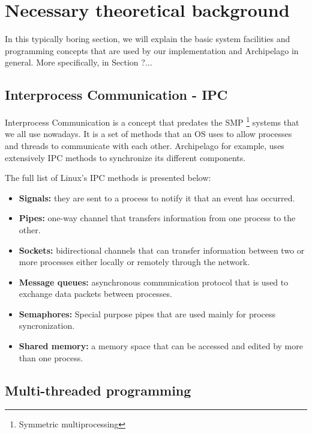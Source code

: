 \chapter{Necessary theoretical background}\label{ch:theory}

In this typically boring section, we will explain the basic system facilities 
and programming concepts that are used by our implementation and Archipelago in 
general. More specifically, in Section ?...

\section{Interprocess Communication - IPC}

Interprocess Communication is a concept that predates the SMP
\footnote{Symmetric multiprocessing}
systems that we all use nowadays. It is a set of methods that an OS uses to 
allow processes and threads to communicate with each other. Archipelago for 
example, uses extensively IPC methods to synchronize its different components.

The full list of Linux's IPC methods is presented below:

\begin{itemize}
	\item \textbf{Signals:} they are sent to a process to notify it that an 
		event has occurred.
	\item \textbf{Pipes:} one-way channel that transfers information from one 
		process to the other.
	\item \textbf{Sockets:} bidirectional channels that can transfer 
		information between two or more processes either locally or remotely 
		through the network.
	\item \textbf{Message queues:} asynchronous communication protocol that is 
		used to exchange data packets between processes.
	\item \textbf{Semaphores:} Special purpose pipes that are used mainly for 
		process syncronization.
	\item \textbf{Shared memory:} a memory space that can be accessed and 
		edited by more than one process.
\end{itemize}


\section{Multi-threaded programming}


